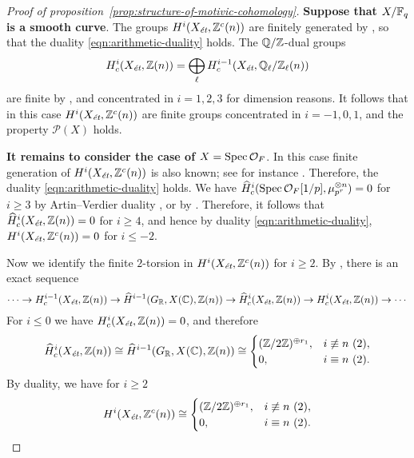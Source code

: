 \documentclass{article}
\numberwithin{equation}{section}
\begin{document}
\begin{proof}[Proof of proposition~\ref{prop:structure-of-motivic-cohomology}]
  \vspace{1em}

  \textbf{Suppose that $X/\FF_q$ is a smooth curve}. The groups
  $H^i (X_\et, \ZZ^c (n))$ are finitely generated by
  \cite[Proposition~4.3]{Geisser-2017}, so that the duality
  \eqref{eqn:arithmetic-duality} holds. The $\QQ/\ZZ$-dual groups
  \[ H^i_c (X_\et, \ZZ(n)) =
    \bigoplus_\ell H^{i-1}_c (X_\et, \QQ_\ell/\ZZ_\ell (n)) \]
  are finite by \cite[Theorem~3]{Kahn-2003}, and concentrated in
  $i = 1,2,3$ for dimension reasons. It follows that in this case
  $H^i (X_\et, \ZZ^c (n))$ are finite groups concentrated in $i = -1,0,1$,
  and the property $\mathcal{P} (X)$ holds.

  \vspace{1em}

  \textbf{It remains to consider the case of $X = \Spec \mathcal{O}_F$}.
  In this case finite generation of $H^i (X_\et, \ZZ^c (n))$ is also known; see
  for instance \cite[Proposition~4.14]{Geisser-2017}. Therefore, the duality
  \eqref{eqn:arithmetic-duality} holds. We have
  $\widehat{H}^i_c (\Spec \mathcal{O}_F [1/p], \mu_{p^r}^{\otimes n}) = 0$ for
  $i \ge 3$ by Artin--Verdier duality
  \cite[Chapter~II, Corollary~3.3]{Milne-ADT}, or by
  \cite[p.\,268]{Soule-1979}. Therefore, it follows that
  $\widehat{H}^i_c (X_\et, \ZZ (n)) = 0$ for $i \ge 4$, and hence by duality
  \eqref{eqn:arithmetic-duality}, $H^i (X_\et, \ZZ^c (n)) = 0$ for $i \le -2$.

  Now we identify the finite $2$-torsion in $H^i (X_\et, \ZZ^c (n))$ for
  $i \ge 2$. By \cite[Lemma~6.14]{Flach-Morin-2018}, there is an exact
  sequence
  \begin{equation}
    \label{eqn:les-Hc-vs-H-hat-c}
    \cdots \to H^{i-1}_c (X_\et, \ZZ (n)) \to
    \widehat{H}^{i-1} (G_\RR, X(\CC), \ZZ (n)) \to
    \widehat{H}^i_c (X_\et, \ZZ (n)) \to
    H^i_c (X_\et, \ZZ (n)) \to \cdots
  \end{equation}
  For $i \le 0$ we have $H^i_c (X_\et, \ZZ (n)) = 0$, and therefore
  \[ \widehat{H}^i_c (X_\et, \ZZ (n)) \cong
    \widehat{H}^{i-1} (G_\RR, X(\CC), \ZZ (n)) \cong
    \begin{cases}
      (\ZZ/2\ZZ)^{\oplus r_1}, & i\not\equiv n ~ (2), \\
      0, & i\equiv n ~ (2).
    \end{cases} \]
  By duality, we have for $i \ge 2$
  \[ H^i (X_\et, \ZZ^c (n)) \cong
    \begin{cases}
      (\ZZ/2\ZZ)^{\oplus r_1}, & i\not\equiv n ~ (2), \\
      0, & i\equiv n ~ (2).
    \end{cases} \]


\end{proof}
\end{document}
